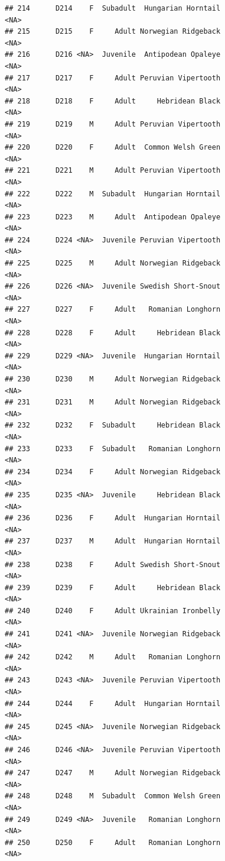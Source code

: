 \documentclass[
]{book}
\begin{document}
\begin{verbatim}
## 214      D214    F  Subadult  Hungarian Horntail                <NA>
## 215      D215    F     Adult Norwegian Ridgeback                <NA>
## 216      D216 <NA>  Juvenile  Antipodean Opaleye                <NA>
## 217      D217    F     Adult Peruvian Vipertooth                <NA>
## 218      D218    F     Adult     Hebridean Black                <NA>
## 219      D219    M     Adult Peruvian Vipertooth                <NA>
## 220      D220    F     Adult  Common Welsh Green                <NA>
## 221      D221    M     Adult Peruvian Vipertooth                <NA>
## 222      D222    M  Subadult  Hungarian Horntail                <NA>
## 223      D223    M     Adult  Antipodean Opaleye                <NA>
## 224      D224 <NA>  Juvenile Peruvian Vipertooth                <NA>
## 225      D225    M     Adult Norwegian Ridgeback                <NA>
## 226      D226 <NA>  Juvenile Swedish Short-Snout                <NA>
## 227      D227    F     Adult   Romanian Longhorn                <NA>
## 228      D228    F     Adult     Hebridean Black                <NA>
## 229      D229 <NA>  Juvenile  Hungarian Horntail                <NA>
## 230      D230    M     Adult Norwegian Ridgeback                <NA>
## 231      D231    M     Adult Norwegian Ridgeback                <NA>
## 232      D232    F  Subadult     Hebridean Black                <NA>
## 233      D233    F  Subadult   Romanian Longhorn                <NA>
## 234      D234    F     Adult Norwegian Ridgeback                <NA>
## 235      D235 <NA>  Juvenile     Hebridean Black                <NA>
## 236      D236    F     Adult  Hungarian Horntail                <NA>
## 237      D237    M     Adult  Hungarian Horntail                <NA>
## 238      D238    F     Adult Swedish Short-Snout                <NA>
## 239      D239    F     Adult     Hebridean Black                <NA>
## 240      D240    F     Adult Ukrainian Ironbelly                <NA>
## 241      D241 <NA>  Juvenile Norwegian Ridgeback                <NA>
## 242      D242    M     Adult   Romanian Longhorn                <NA>
## 243      D243 <NA>  Juvenile Peruvian Vipertooth                <NA>
## 244      D244    F     Adult  Hungarian Horntail                <NA>
## 245      D245 <NA>  Juvenile Norwegian Ridgeback                <NA>
## 246      D246 <NA>  Juvenile Peruvian Vipertooth                <NA>
## 247      D247    M     Adult Norwegian Ridgeback                <NA>
## 248      D248    M  Subadult  Common Welsh Green                <NA>
## 249      D249 <NA>  Juvenile   Romanian Longhorn                <NA>
## 250      D250    F     Adult   Romanian Longhorn                <NA>

\end{verbatim}
\end{document}
